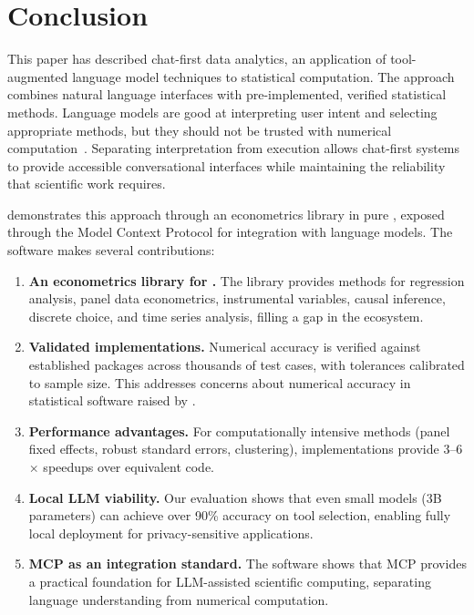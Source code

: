 
\section{Conclusion} \label{sec:conclusion}

This paper has described chat-first data analytics, an application of
tool-augmented language model techniques to statistical computation. The approach
combines natural language interfaces with pre-implemented, verified statistical
methods. Language models are good at interpreting user intent and selecting
appropriate methods, but they should not be trusted with numerical
computation~\citep{Schick+etal:2023}. Separating interpretation from execution
allows chat-first systems to provide accessible conversational interfaces
while maintaining the reliability that scientific work requires.

 demonstrates this approach through an econometrics
library in pure , exposed through the Model Context Protocol
for integration with language models. The software makes several contributions:

\begin{enumerate}
  \item \textbf{An econometrics library for .} The
     library provides methods for regression analysis, panel
    data econometrics, instrumental variables, causal inference, discrete choice,
    and time series analysis, filling a gap in the  ecosystem.

  \item \textbf{Validated implementations.} Numerical accuracy is verified
    against established  packages across thousands of test cases,
    with tolerances calibrated to sample size. This addresses concerns about
    numerical accuracy in statistical software raised by \cite{McCullough:1997}.

  \item \textbf{Performance advantages.} For computationally intensive methods
    (panel fixed effects, robust standard errors, clustering), 
    implementations provide 3--6$\times$ speedups over equivalent 
    code.

  \item \textbf{Local LLM viability.} Our evaluation shows that even
    small models (3B parameters) can achieve over 90\% accuracy on tool
    selection, enabling fully local deployment for privacy-sensitive applications.

  \item \textbf{MCP as an integration standard.} The software shows that
    MCP provides a practical foundation for LLM-assisted scientific computing,
    separating language understanding from numerical computation.
\end{enumerate}

